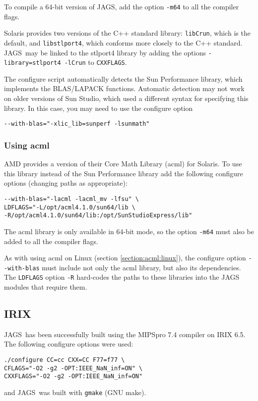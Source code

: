 \documentclass[11pt, a4paper, titlepage]{report}
\newcommand{\JAGS}{\textsf{JAGS}}
\begin{document}
To compile a 64-bit version of JAGS, add the option \verb+-m64+ to
all the compiler flags.

Solaris provides two versions of the C++ standard library:
\texttt{libCrun}, which is the default, and \texttt{libstlport4},
which conforms more closely to the C++ standard. \JAGS\ may be linked
to the stlport4 library by adding the options
\verb+-library=stlport4 -lCrun+ to \verb+CXXFLAGS+.

The configure script automatically detects the Sun Performance library,
which implements the BLAS/LAPACK functions.  Automatic detection may
not work on older versions of Sun Studio, which used a different syntax
for specifying this library.  In this case, you may need to use the
configure option
\begin{verbatim}
--with-blas="-xlic_lib=sunperf -lsunmath"
\end{verbatim}

\subsubsection{Using acml}

AMD provides a version of their Core Math Library (acml) for
Solaris. To use this library instead of the Sun Performance library
add the following configure options (changing paths as appropriate):
\begin{verbatim}
--with-blas="-lacml -lacml_mv -lfsu" \
LDFLAGS="-L/opt/acml4.1.0/sun64/lib \
-R/opt/acml4.1.0/sun64/lib:/opt/SunStudioExpress/lib"
\end{verbatim}
The acml library is only available in 64-bit mode, so the option
\verb+-m64+ must also be added to all the compiler flags.

As with using acml on Linux (section \ref{section:acml:linux}), the
configure option \verb+--with-blas+ must include not only the acml
library, but also its dependencies. The \verb+LDFLAGS+ option \verb+-R+
hard-codes the paths to these libraries into the JAGS modules that
require them.

\subsection{IRIX}


\JAGS\ has been successfully built using the MIPSpro 7.4 compiler on
IRIX 6.5. The following configure options were used:
\begin{verbatim}
./configure CC=cc CXX=CC F77=f77 \
CFLAGS="-O2 -g2 -OPT:IEEE_NaN_inf=ON" \
CXXFLAGS="-O2 -g2 -OPT:IEEE_NaN_inf=ON" 
\end{verbatim}
and \JAGS\ was built with \verb+gmake+ (GNU make).
\end{document}

